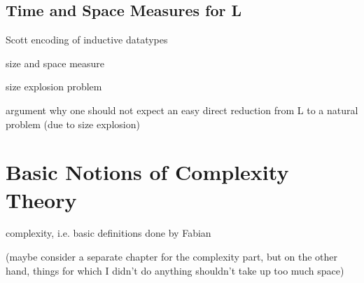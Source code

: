 \subsection{Time and Space Measures for L}



Scott encoding of inductive datatypes

size and space measure

size explosion problem

argument why one should not expect an easy direct reduction from L to a natural problem (due to size explosion)

\section{Basic Notions of Complexity Theory}\label{sec:np_basics}
complexity, i.e. basic definitions done by Fabian

(maybe consider a separate chapter for the complexity part, but on the other hand, things for which I didn't do anything shouldn't take up too much space)



